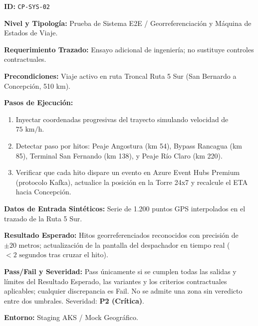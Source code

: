\par\noindent\textbf{ID:} \texttt{C\allowbreak{}P\allowbreak{}-\allowbreak{}S\allowbreak{}Y\allowbreak{}S\allowbreak{}-\allowbreak{}0\allowbreak{}2\allowbreak{}}\par
\par\noindent\textbf{Nivel y Tipología:} Prueba de Sistema E2E / Georreferenciación y Máquina de Estados de Viaje.\par
\par\noindent\textbf{Requerimiento Trazado:} Ensayo adicional de ingeniería; no sustituye controles contractuales.\par
\par\noindent\textbf{Precondiciones:} Viaje activo en ruta Troncal Ruta 5 Sur (San Bernardo a Concepción, 510 km).\par
\par\noindent\textbf{Pasos de Ejecución:} \par
\begin{enumerate}
\item Inyectar coordenadas progresivas del trayecto simulando velocidad de \(75\text{ km/h}\).
\item Detectar paso por hitos: Peaje Angostura (km 54), Bypass Rancagua (km 85), Terminal San Fernando (km 138), y Peaje Río Claro (km 220).
\item Verificar que cada hito dispare un evento en Azure Event Hubs Premium (protocolo Kafka), actualice la posición en la Torre 24x7 y recalcule el ETA hacia Concepción.
\end{enumerate}
\par\noindent\textbf{Datos de Entrada Sintéticos:} Serie de 1.200 puntos GPS interpolados en el trazado de la Ruta 5 Sur.\par
\par\noindent\textbf{Resultado Esperado:} Hitos georreferenciados reconocidos con precisión de \(\pm 20\text{ metros}\); actualización de la pantalla del despachador en tiempo real (\(< 2\text{ segundos}\) tras cruzar el hito).\par
\par\noindent\textbf{Pass/Fail y Severidad:} Pass únicamente si se cumplen todas las salidas y límites del Resultado Esperado, las variantes y los criterios contractuales aplicables; cualquier discrepancia es Fail. No se admite una zona sin veredicto entre dos umbrales. Severidad: \textbf{P2 (Crítica)}.\par
\par\noindent\textbf{Entorno:} Staging AKS / Mock Geográfico.\par






